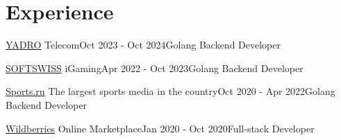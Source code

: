 \section{Experience}

\begin{experienceEntry}
{\href{https://yadro.com/}{\underline{YADRO}}}
{Telecom}{Oct 2023 - Oct 2024}{Golang Backend Developer}
    {}
\end{experienceEntry}

\vspace{1em}

\begin{experienceEntry}
{\href{https://softswiss.com}{\underline{SOFTSWISS}}}
{iGaming}{Apr 2022 - Oct 2023}{Golang Backend Developer}
    {}
\end{experienceEntry}

\vspace{1em}

\begin{experienceEntry}
{\href{https://sports.ru}{\underline{Sports.ru}}}
{The largest sports media in the country}{Oct 2020 - Apr 2022}{Golang Backend Developer}
    {}
\end{experienceEntry}

\vspace{1em}

\begin{experienceEntry}
{\href{https://wildberries.ru}{\underline{Wildberries}}}
{Online Marketplace}{Jan 2020 - Oct 2020}{Full-stack Developer}
    {}
\end{experienceEntry}

\vspace{1em}
